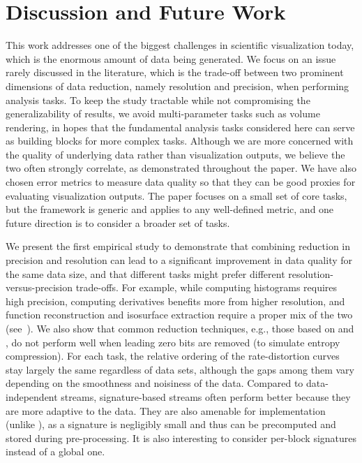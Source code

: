 \section{Discussion and Future Work}

{\color{blue}This work addresses one of the biggest challenges in scientific visualization today,
which is the enormous amount of data being generated. We focus on an issue rarely discussed in the
literature, which is the trade-off between two prominent dimensions of data reduction, namely
resolution and precision, when performing analysis tasks. To keep the study tractable while not
compromising the generalizability of results, we avoid multi-parameter tasks such as volume
rendering, in hopes that the fundamental analysis tasks considered here can serve as building blocks
for more complex tasks. Although we are more concerned with the quality of underlying data rather
than visualization outputs, we believe the two often strongly correlate, as demonstrated throughout
the paper. We have also chosen error metrics to measure data quality so that they can be good
proxies for evaluating visualization outputs. The paper focuses on a small set of core tasks, but
the framework is generic and applies to any well-defined metric, and one future direction is to
consider a broader set of tasks.}

We present the first empirical study to demonstrate that combining reduction in precision and
resolution can lead to a significant improvement in data quality for the same data size, and that
different tasks might prefer different resolution-versus-precision trade-offs. For example, while
computing histograms requires high precision, computing derivatives benefits more from higher
resolution, and function reconstruction and isosurface extraction require a proper mix of the two
(see~). We also show that common reduction techniques, e.g., those based on
\slvl and \smag, do not perform well when leading zero bits are removed (to simulate entropy
compression). {\color{red}For each task, the relative ordering of the rate-distortion curves stay
largely the same regardless of data sets, although the gaps among them vary depending on the
smoothness and noisiness of the data. Compared to data-independent streams, signature-based streams
often perform better because they are more adaptive to the data. They are also amenable for
implementation (unlike \sopt), as a signature is negligibly small and thus can be precomputed and
stored during pre-processing. It is also interesting to consider per-block signatures instead of a
global one.}

